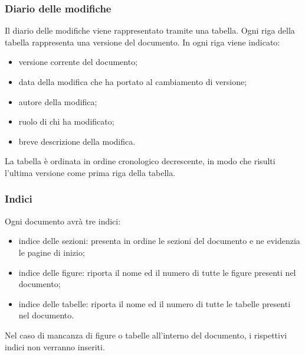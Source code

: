 \subsubsection{Diario delle modifiche}
Il diario delle modifiche viene rappresentato tramite una tabella. Ogni riga della tabella rappresenta una versione del documento. In ogni riga viene indicato: 
\begin{itemize}
	\item versione corrente del documento; 
	\item data della modifica che ha portato al cambiamento di versione; 
	\item autore della modifica;
	\item ruolo di chi ha modificato; 
	\item breve descrizione della modifica. 
\end{itemize}
La tabella è ordinata in ordine cronologico decrescente, in modo che risulti l'ultima versione come prima riga della tabella.

\subsubsection{Indici}
Ogni documento avrà tre indici: 
\begin{itemize}
	\item indice delle sezioni: presenta in ordine le sezioni del documento e ne evidenzia le pagine di inizio;
	\item indice delle figure: riporta il nome ed il numero di tutte le figure presenti nel documento;
	\item indice delle tabelle: riporta il nome ed il numero di tutte le tabelle presenti nel documento.
\end{itemize}
Nel caso di mancanza di figure o tabelle all'interno del documento, i rispettivi indici non verranno inseriti.

